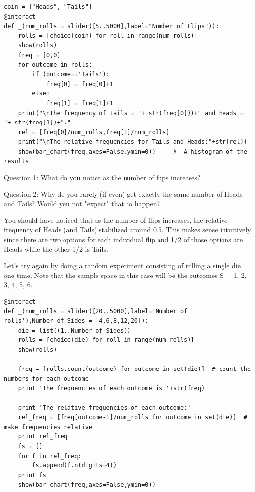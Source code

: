 \documentclass[10pt,]{book}
\theoremstyle{plain}
\theoremstyle{definition}
\theoremstyle{definition}
\theoremstyle{definition}
\numberwithin{equation}{section}
\begin{document}
\begin{lstlisting}[style=sageinput]
coin = ["Heads", "Tails"]
@interact
def _(num_rolls = slider([5..5000],label="Number of Flips")):
	rolls = [choice(coin) for roll in range(num_rolls)]
	show(rolls)   
	freq = [0,0]
	for outcome in rolls:
		if (outcome=='Tails'):
			freq[0] = freq[0]+1
		else:
			freq[1] = freq[1]+1
	print("\nThe frequency of tails = "+ str(freq[0]))+" and heads = "+ str(freq[1])+"."
	rel = [freq[0]/num_rolls,freq[1]/num_rolls]
	print("\nThe relative frequencies for Tails and Heads:"+str(rel))
	show(bar_chart(freq,axes=False,ymin=0))     #  A histogram of the results
\end{lstlisting}

%
\par

	Question 1: What do you notice as the number of flips increases?
\par

	Question 2: Why do you rarely (if even) get exactly the same number of Heads and Tails? Would you not "expect"
	that to happen?
\par
You should have noticed that as the number of flips increases, the relative frequency of Heads (and Tails)
	stabilized around 0.5. This makes sense intuitively since there are two options for each 
	individual flip and 1/2 of those options are Heads while the other 1/2 is Tails.%
\par

	Let's try again
	by doing a random experiment consisting of rolling a single die one time. Note that the sample space 
	in this case will be the outcomes S = {1, 2, 3, 4, 5, 6}.
\par

\begin{lstlisting}[style=sageinput]
@interact
def _(num_rolls = slider([20..5000],label='Number of rolls'),Number_of_Sides = [4,6,8,12,20]):
	die = list((1..Number_of_Sides))
	rolls = [choice(die) for roll in range(num_rolls)]
	show(rolls)   

	freq = [rolls.count(outcome) for outcome in set(die)]  # count the numbers for each outcome
	print 'The frequencies of each outcome is '+str(freq)

	print 'The relative frequencies of each outcome:'
	rel_freq = [freq[outcome-1]/num_rolls for outcome in set(die)]  # make frequencies relative
	print rel_freq
	fs = []
	for f in rel_freq:
		fs.append(f.n(digits=4))
	print fs
	show(bar_chart(freq,axes=False,ymin=0))
\end{lstlisting}
\end{document}
